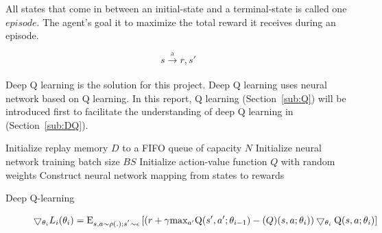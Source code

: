 \documentclass[conference]{IEEEtran}
\begin{document}
All states that come in between an initial-state and a terminal-state is called one $episode$. The agent's goal it to maximize the total reward it receives during an episode. 

\begin{equation}\label{eqn:1}
    s \xrightarrow[]{\text{a}} r, s{}'
\end{equation}

Deep Q learning is the solution for this project. Deep Q learning uses neural network based on Q learning. In this report, Q learning (Section~\ref{sub:Q}) will be introduced first to facilitate the understanding of deep Q learning in (Section~\ref{sub:DQ}).

\begin{algorithm*}\label{al:1}
\SetAlgoLined
Initialize replay memory $D$ to a FIFO queue of capacity $N$\;
Initialize neural network training batch size $BS$\;
Initialize action-value function $Q$ with random weights\;
Construct neural network mapping from states to rewards\;
 \caption{Deep Q-learning}
\end{algorithm*}

\begin{figure}
\begin{equation}\label{eqn:4}
\bigtriangledown _{\theta_i}L_i(\theta_i)=\text{E}_{s,a\sim \rho(.);s^{'}\sim\epsilon}    \left [(r+\gamma\text{max}_{a{}'} \text{Q}(s',a';\theta_{i-1}) - \text(Q)(s,a;\theta_{i}))\bigtriangledown _{\theta_i}\text{Q}(s,a;\theta_i)  \right ]   
\end{equation}
\end{figure}
\end{document}
